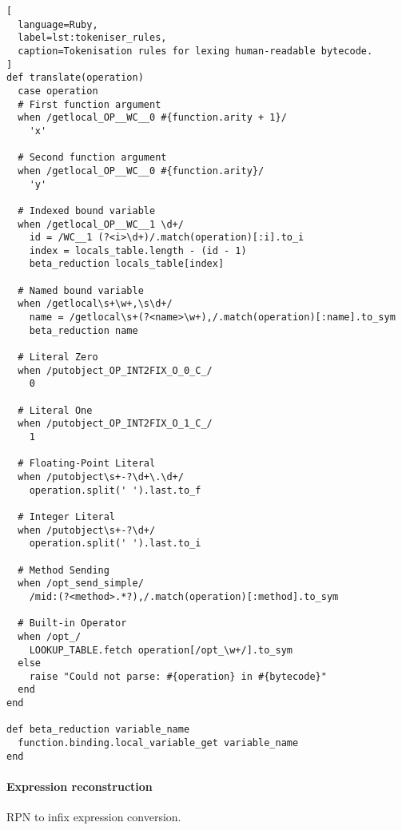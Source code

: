 \begin{lstlisting}[
  language=Ruby,
  label=lst:tokeniser_rules,
  caption=Tokenisation rules for lexing human-readable bytecode.
]
def translate(operation)
  case operation
  # First function argument
  when /getlocal_OP__WC__0 #{function.arity + 1}/
    'x'

  # Second function argument
  when /getlocal_OP__WC__0 #{function.arity}/
    'y'

  # Indexed bound variable
  when /getlocal_OP__WC__1 \d+/
    id = /WC__1 (?<i>\d+)/.match(operation)[:i].to_i
    index = locals_table.length - (id - 1)
    beta_reduction locals_table[index]

  # Named bound variable
  when /getlocal\s+\w+,\s\d+/
    name = /getlocal\s+(?<name>\w+),/.match(operation)[:name].to_sym
    beta_reduction name

  # Literal Zero
  when /putobject_OP_INT2FIX_O_0_C_/
    0

  # Literal One
  when /putobject_OP_INT2FIX_O_1_C_/
    1

  # Floating-Point Literal
  when /putobject\s+-?\d+\.\d+/
    operation.split(' ').last.to_f

  # Integer Literal
  when /putobject\s+-?\d+/
    operation.split(' ').last.to_i

  # Method Sending
  when /opt_send_simple/
    /mid:(?<method>.*?),/.match(operation)[:method].to_sym

  # Built-in Operator
  when /opt_/
    LOOKUP_TABLE.fetch operation[/opt_\w+/].to_sym
  else
    raise "Could not parse: #{operation} in #{bytecode}"
  end
end

def beta_reduction variable_name
  function.binding.local_variable_get variable_name
end
\end{lstlisting}

\paragraph*{Expression reconstruction}

\begin{algorithm}[h]
  \caption{\ac{RPN} to infix expression conversion.}
  \label{alg:to_infix}

  \begin{algorithmic}
    \Else
    \EndIf
    \EndWhile
    \EndFunction
  \end{algorithmic}
\end{algorithm}

